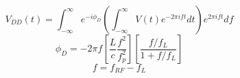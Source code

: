 \documentclass{slides}
\begin{document}
\begin{slide}
\begin{displaymath}
V_{DD}(t) = 
\int_{-\infty}^{\infty}
e^{-i \phi_D}
\left ( \int_{-\infty}^{\infty} V(t) e^{-2 \pi i f t} dt \right )
e^{2 \pi i f t} df
\end{displaymath}
\begin{displaymath}
\phi_D = -2 \pi f \left [ \frac{L}{c} \frac{f^2}{f_p^2} \right ]
\left [ \frac{f/f_L}{1 + f/f_L} \right ]
\end{displaymath}
\begin{displaymath}
f = f_{RF} - f_L
\end{displaymath}
\end{slide}
\end{document}
